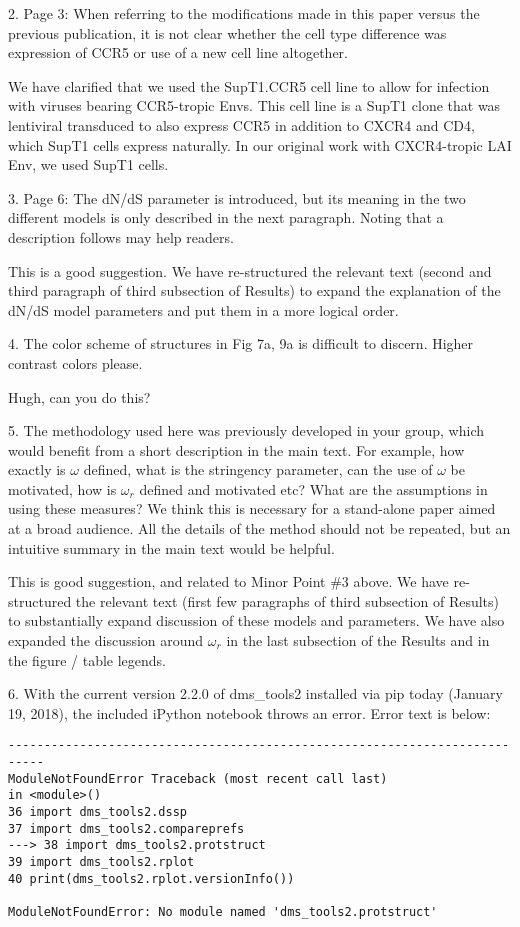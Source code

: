 \documentclass[11pt, oneside]{article}   	%
\begin{document}
2. Page 3: When referring to the modifications made in this paper versus the previous publication, it is not clear whether the cell type difference was expression of CCR5 or use of a new cell line altogether. 

{\color{black}
We have clarified that we used the SupT1.CCR5 cell line to allow for infection with viruses bearing CCR5-tropic Envs. This cell line is a SupT1 clone that was lentiviral transduced to also express CCR5 in addition to CXCR4 and CD4, which SupT1 cells express naturally. In our original work with CXCR4-tropic LAI Env, we used SupT1 cells. 
}

3. Page 6: The dN/dS parameter is introduced, but its meaning in the two different models is only described in the next paragraph. Noting that a description follows may help readers. 

{\color{black}
This is a good suggestion.
We have re-structured the relevant text (second and third paragraph of third subsection of Results) to expand the explanation of the dN/dS model parameters and put them in a more logical order.}

4. The color scheme of structures in Fig 7a, 9a is difficult to discern. Higher contrast colors please. 

{\color{red}
Hugh, can you do this?}

5. The methodology used here was previously developed in your group, which would benefit from a short description in the main text. For example, how exactly is $\omega$ defined, what is the stringency parameter, can the use of $\omega$ be motivated, how is $\omega_r$ defined and motivated etc? What are the assumptions in using these measures? We think this is necessary for a stand-alone paper aimed at a broad audience. All the details of the method should not be repeated, but an intuitive summary in the main text would be helpful. 

{\color{black}
This is good suggestion, and related to Minor Point \#3 above.
We have re-structured the relevant text (first few paragraphs of third subsection of Results) to substantially expand discussion of these models and parameters.
We have also expanded the discussion around $\omega_r$ in the last subsection of the Results and in the figure / table legends.}

6. With the current version 2.2.0 of dms\_tools2 installed via pip today (January 19, 2018), the included iPython notebook throws an error. Error text is below: 
\begin{verbatim}
--------------------------------------------------------------------------- 
ModuleNotFoundError Traceback (most recent call last) 
in <module>() 
36 import dms_tools2.dssp 
37 import dms_tools2.compareprefs 
---> 38 import dms_tools2.protstruct 
39 import dms_tools2.rplot 
40 print(dms_tools2.rplot.versionInfo()) 

ModuleNotFoundError: No module named 'dms_tools2.protstruct'
\end{verbatim}
\end{document}
